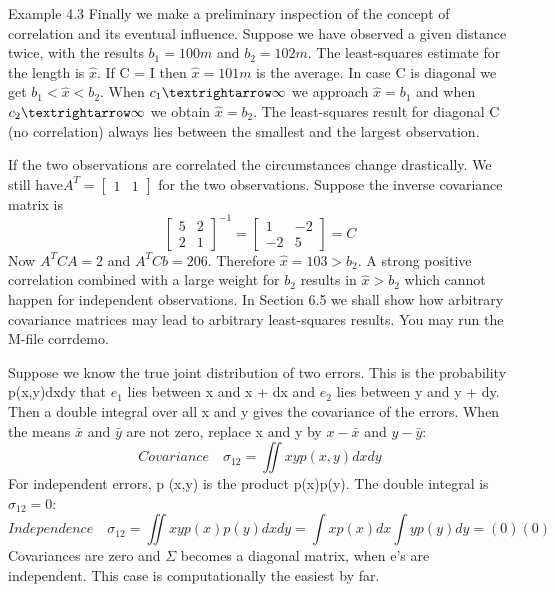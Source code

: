 	Example 4.3\; Finally we make a preliminary inspection of the concept of correlation and
	its eventual influence. Suppose we have observed a given distance twice, with the results
    $b_1=100m$ and $b_2=102m$. The least-squares estimate for the length is $\hat{x}$. If C = I then
	$\hat{x}=101m$ is the average. In case C is diagonal we get $b_1<\hat{x}<b_2$. When $c_1\textrightarrow \infty$ we approach $\hat{x}=b_1$ and when $c_2\textrightarrow \infty$ we obtain $\hat{x}=b_2$. The least-squares result for diagonal C (no correlation) always lies between the smallest and the largest observation.
	
	If the two observations are correlated the circumstances change drastically. We still
	have$A^T=\begin{bmatrix} 1 & 1\end{bmatrix}$ for the two observations. Suppose the inverse covariance matrix is
	\begin{equation*}
	\begin{bmatrix}
	5 & 2 \\ 2 & 1
	\end{bmatrix}^{-1}
	=
	\begin{bmatrix}
	1 & -2 \\ -2 & 5
	\end{bmatrix}
	=C
	\end{equation*}
	Now $A^TCA=2$ and $A^TCb=206$. Therefore $\hat{x}=103>b_2$. A strong positive correlation
	combined with a large weight for $b_2$ results in $\hat{x}>b_2$ which cannot happen for independent observations. In Section 6.5 we shall show how arbitrary covariance matrices may lead to arbitrary least-squares results. You may run the M-file corrdemo.
	
	Suppose we know the true joint distribution of two errors. This is the probability
	p(x,y)dxdy that $e_1$ lies between x and x + dx and	$e_2$ lies between y and y + dy. Then a
	double integral over all x and y gives the covariance of the errors. When the means $\bar{x}$ and $\bar{y}$ are not zero, replace x and y by $x-\bar{x}$ and $y-\bar{y}$:
	\begin{equation}
	Covariance \quad
	\sigma_12=\iint xyp(x,y)dxdy
	\end{equation}
	For independent errors, p (x,y) is the product p(x)p(y). The double integral is $\sigma_12=0$:
	\begin{equation*}
	Independence \quad
	\sigma_12=\iint xyp(x)p(y)dxdy=\int xp(x)dx\int yp(y)dy=(0)(0)
	\end{equation*}
	Covariances are zero and $\Sigma$ becomes a diagonal matrix, when e's are independent. This
	case is computationally the easiest by far.
	

